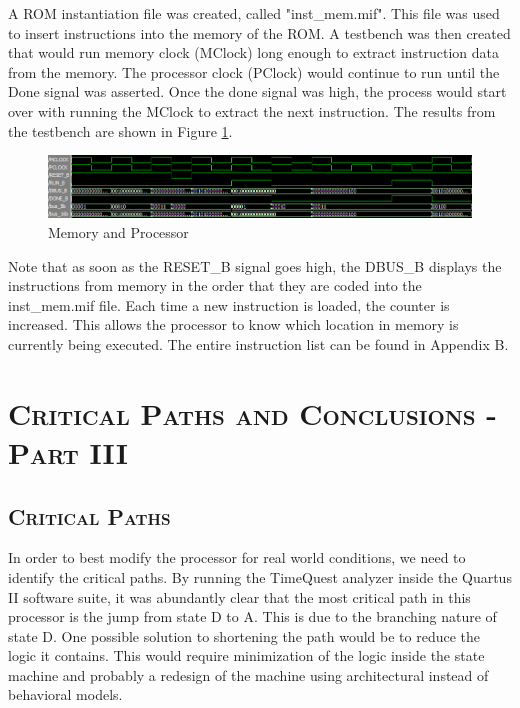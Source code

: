 \documentclass[11pt]{report}
\begin{document}
\begin{spacing}{1.5}
A ROM instantiation file was created, called "inst\_mem.mif".  This file was used to insert instructions into the memory of the ROM.  A testbench was then created that would run memory clock (MClock) long enough to extract instruction data from the memory.   The processor clock (PClock) would continue to run until the Done signal was asserted.  Once the done signal was high, the process would start over with running the MClock to extract the next instruction.  The results from the testbench are shown in Figure \ref{fig:part2}.

\vspace{15px}
\begin{figure}[H]
    \centering
    \includegraphics[width=1.0\textwidth,keepaspectratio]{tb_lab5b.png}
    \caption{Memory and Processor}
    \label{fig:part2}
\end{figure}

Note that as soon as the RESET\_B signal goes high, the DBUS\_B displays the instructions from memory in the order that they are coded into the inst\_mem.mif file.  Each time a new instruction is loaded, the counter is increased.  This allows the processor to know which location in memory is currently being executed.  The entire instruction list can be found in Appendix B.

\section*{\scshape Critical Paths and Conclusions - Part III} %
\label{sec:conclusions}

\setcounter{chapter}{3}
\setcounter{section}{1}
\setcounter{subsection}{0}
\subsection{\scshape Critical Paths}

In order to best modify the processor for real world conditions, we need to identify the critical paths.  By running the TimeQuest analyzer inside the Quartus II software suite, it was abundantly clear that the most critical path in this processor is the jump from state D to A.  This is due to the branching nature of state D.  One possible solution to shortening the path would be to reduce the logic it contains.  This would require minimization of the logic inside the state machine and probably a redesign of the machine using architectural instead of behavioral models.


\end{spacing}
\end{document}
